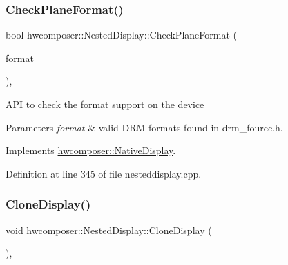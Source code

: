 \subsubsection{\texorpdfstring{Check\+Plane\+Format()}{CheckPlaneFormat()}}
{\footnotesize\ttfamily bool hwcomposer\+::\+Nested\+Display\+::\+Check\+Plane\+Format (\begin{DoxyParamCaption}\item[{uint32\+\_\+t}]{format }\end{DoxyParamCaption})\hspace{0.3cm}{\ttfamily [override]}, {\ttfamily [virtual]}}

A\+PI to check the format support on the device 
\begin{DoxyParams}{Parameters}
{\em format} & valid D\+RM formats found in drm\+\_\+fourcc.\+h. \\
\hline
\end{DoxyParams}


Implements \mbox{\hyperlink{classhwcomposer_1_1NativeDisplay_a4e856b5754054bdf77467e6663cb5b50}{hwcomposer\+::\+Native\+Display}}.



Definition at line 345 of file nesteddisplay.\+cpp.


\begin{DoxyCode}{0}
\end{DoxyCode}
\mbox{\label{classhwcomposer_1_1NestedDisplay_a5dda0f532650e43eec782e81074563b3}} 
\subsubsection{\texorpdfstring{Clone\+Display()}{CloneDisplay()}}
{\footnotesize\ttfamily void hwcomposer\+::\+Nested\+Display\+::\+Clone\+Display (\begin{DoxyParamCaption}\item[{\mbox{\hyperlink{classhwcomposer_1_1NativeDisplay}{Native\+Display}} $\ast$}]{ }\end{DoxyParamCaption})\hspace{0.3cm}{\ttfamily [override]}, {\ttfamily [virtual]}}

